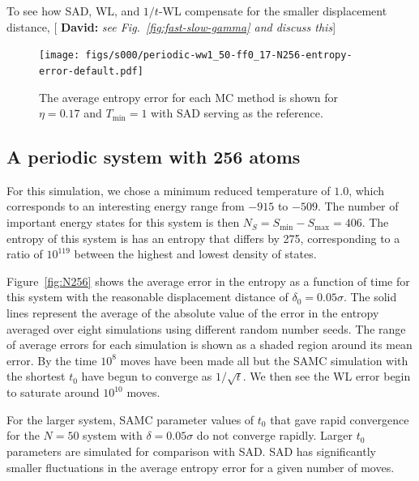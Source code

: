 \documentclass[letterpaper,twocolumn,amsmath,amssymb,pre,aps,10pt]{revtex4-1}
\newcommand{\green}[1]{{\bf \color{green} #1}}
\newcommand{\davidsays}[1]{{\color{red} [\green{David:} \emph{#1}]}}
\begin{document}
To see how SAD, WL, and $1/t$-WL compensate for the smaller
displacement distance, \davidsays{see Fig.~\ref{fig:fast-slow-gamma}
  and discuss this}

\begin{figure}
\texttt{[image: figs/s000/periodic-ww1\_50-ff0\_17-N256-entropy-error-default.pdf]}
  \caption{The average entropy error for each MC method is shown for $\eta = 0.17$ and $T_{\min} = 1$ with
  SAD serving as the reference.}\label{fig:n256}
\end{figure}


\subsection{A periodic system with 256 atoms}
For this simulation, we chose a minimum reduced
temperature of $1.0$, which corresponds to an interesting energy range
from $-915$ to $-509$.  The number of important energy states for this
system is then $N_S = S_{\min} - S_{\max} = 406$.
The entropy of this system is has an entropy that
differs by 275, corresponding to a ratio of
$10^{119}$ between the highest and lowest density of states.

Figure~\ref{fig:N256} shows the average error in the
entropy as a function of time for this system with the reasonable
displacement distance of $\delta_0 = 0.05\sigma$.  The solid lines
represent the average of the absolute value of the error in the
entropy averaged over eight simulations using different random number
seeds.  The range of average errors for each simulation is shown as a
shaded region around its mean error.  By the time $10^8$ moves have
been made all but the SAMC simulation with the shortest $t_0$ have
begun to converge as $1/\sqrt{t}$.  We then see the WL error begin to
saturate around $10^{10}$ moves.


For the larger system, SAMC parameter values of $t_0$ that gave rapid
convergence for the $N = 50$ system with $\delta = 0.05\sigma$ do not
converge rapidly.  Larger $t_0$ parameters are simulated for
comparison with SAD.  SAD has significantly smaller fluctuations
in the average entropy error for a given number of moves.
\end{document}
